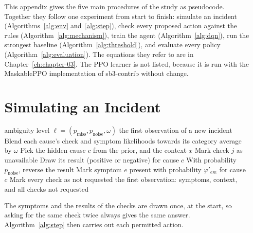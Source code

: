 \algrenewcommand{}
\algrenewcommand{}

This appendix gives the five main procedures of the study as pseudocode. Together they follow one experiment from start to finish: simulate an incident (Algorithms~\ref{alg:env} and~\ref{alg:step}), check every proposed action against the rules (Algorithm~\ref{alg:mechanism}), train the agent (Algorithm~\ref{alg:dqn}), run the strongest baseline (Algorithm~\ref{alg:threshold}), and evaluate every policy (Algorithm~\ref{alg:evaluation}). The equations they refer to are in Chapter~\ref{ch:chapter-03}. The PPO learner is not listed, because it is run with the MaskablePPO implementation of sb3-contrib without change.

\section{Simulating an Incident}

\begin{algorithm}[H]
\caption{Simulating one incident}
\label{alg:env}
\begin{algorithmic}[1]
\Require ambiguity level $\ell = (p_{\text{miss}}, p_{\text{noise}}, \omega)$
\Ensure the first observation of a new incident
  \State Blend each cause's check and symptom likelihoods towards its category average by $\omega$ 
  \State Pick the hidden cause $c$ from the prior, and the context $x$
      \State Mark check $j$ as unavailable
    \Else
      \State Draw its result (positive or negative) for cause $c$
      \State With probability $p_{\text{noise}}$, reverse the result
    \EndIf
  \EndFor
    \State Mark symptom $e$ present with probability $\varphi'_{em}$ for cause $c$ 
  \EndFor
  \State Mark every check as not requested
  \State \Return the first observation: symptoms, context, and all checks not requested
\EndProcedure
\end{algorithmic}
\end{algorithm}

The symptoms and the results of the checks are drawn once, at the start, so asking for the same check twice always gives the same answer. Algorithm~\ref{alg:step} then carries out each permitted action.

